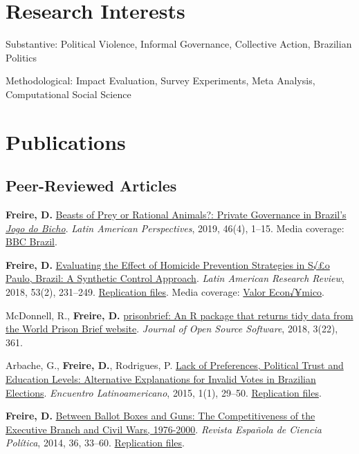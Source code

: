 \documentclass[a4paper]{article}
\renewenvironment{itemize}{
  \begin{list}{}{
    \setlength{\leftmargin}{1.5em}
  }
}{
  \end{list}
}
\begin{document}
\section*{Research Interests}

\begin{itemize}
 	\item Substantive: Political Violence, Informal Governance, Collective Action, Brazilian Politics %
 	\item Methodological: Impact Evaluation, Survey Experiments, Meta Analysis, Computational Social Science 
\end{itemize}

\section*{Publications}

\subsection*{Peer-Reviewed Articles}

\begin{itemize}
	\item \textbf{Freire, D.} \href{https://doi.org/10.1177/0094582X19846519}{Beasts of Prey or Rational Animals?: Private Governance in Brazil's \emph{Jogo do Bicho}}. \textit{Latin American Perspectives}, 2019, 46(4), 1--15. Media coverage: \href{http://www.bbc.com/portuguese/brasil-40140693}{BBC Brazil}.
	\item \textbf{Freire, D.} \href{https://larrlasa.org/articles/10.25222/larr.334/}{Evaluating the Effect of Homicide Prevention Strategies in S√£o Paulo, Brazil: A Synthetic Control Approach}. \textit{Latin American Research Review}, 2018, 53(2), 231--249. \href{https://github.com/danilofreire/homicides-sp-synth}{Replication files}. Media coverage: \href{http://www.valor.com.br/cultura/5111524/sangue-no-asfalto}{Valor Econ√¥mico}.
	\item McDonnell, R., \textbf{Freire, D.} \href{https://doi.org/10.21105/joss.00361}{prisonbrief: An R package that returns tidy data from the World Prison Brief website}. \textit{Journal of Open Source Software}, 2018, 3(22), 361. 
	\item Arbache, G., \textbf{Freire, D.}, Rodrigues, P. \href{http://www.iapss.org/wp-content/uploads/2014/10/ELA1.1_2.Lack-of-Preferences-Political-Trust-and-Education-Levels.pdf}{Lack of Preferences, Political Trust and Education Levels: Alternative Explanations for Invalid Votes in Brazilian Elections}. \textit{Encuentro Latinoamericano}, 2015, 1(1), 29--50. \href{https://github.com/danilofreire/invalid-votes-brazil}{Replication files}.
	\item \textbf{Freire, D.} \href{http://recyt.fecyt.es/index.php/recp/article/view/37638}{Between Ballot Boxes and Guns: The Competitiveness of the Executive Branch and Civil Wars, 1976-2000}. \textit{Revista Espa\~{n}ola de Ciencia Pol\'{i}tica}, 2014, 36, 33--60. \href{https://doi.org/10.7910/DVN/NSDUYG}{Replication files}.
\end{itemize}
\end{document}
